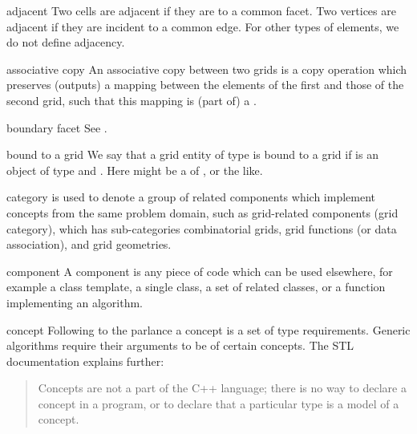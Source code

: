 
\begin{Glossar}
\item[adjacent]
  Two cells are adjacent if they are  
  to a common facet.
  Two vertices are adjacent if they are incident to a common edge.
  For other types of elements, we do not define adjacency.

\item[associative copy]
  An associative copy between two grids is a copy operation
  which preserves (outputs) a mapping between the elements of the first and
  those of the second grid, such that this mapping is (part of) a 
  .

\item[boundary facet] See .

\item[bound to a grid] 
  We say that a grid entity  of type 
  is bound to a grid 
  if  is an object of type  
  and .
  Here  might be a  of 
  ,
   or the like.

\item[category]
  is used to denote a group of related components
  which implement concepts from the same problem domain, such
  as grid-related components (grid category), which has 
  sub-categories combinatorial grids, grid functions (or data association),
  and grid geometries.

\item[component]
  A component is any piece of code which can be used elsewhere,
  for example a class template, a single class, a set of related classes,
  or a function implementing an algorithm.

\item[concept]
  Following to the 
   parlance
  a concept is a set of type requirements.
  Generic algorithms require their arguments to be 
  of certain concepts.
  The STL documentation explains further:
  \begin{quote}
    Concepts are not a part of the C++ language; there is no way to declare a concept in a
    program, or to declare that a particular type is a model of a concept.
  \end{quote}


\end{Glossar}
